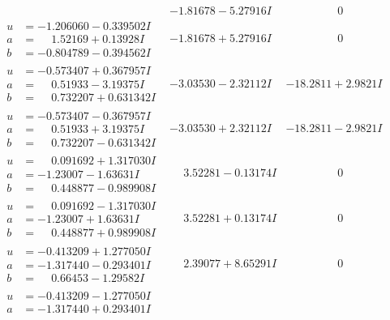 \documentclass[1p]{elsarticle_modified}
\theoremstyle{definition}
\begin{document}
$$\begin{array}{c|c|c}
 & -1.81678 - 5.27916 I & \phantom{-0.000000 } 0 \\ \hline\begin{aligned}
u &= -1.206060 - 0.339502 I \\
a &= \phantom{-}1.52169 + 0.13928 I \\
b &= -0.804789 - 0.394562 I\end{aligned}
 & -1.81678 + 5.27916 I & \phantom{-0.000000 } 0 \\ \hline\begin{aligned}
u &= -0.573407 + 0.367957 I \\
a &= \phantom{-}0.51933 - 3.19375 I \\
b &= \phantom{-}0.732207 + 0.631342 I\end{aligned}
 & -3.03530 - 2.32112 I & -18.2811 + 2.9821 I \\ \hline\begin{aligned}
u &= -0.573407 - 0.367957 I \\
a &= \phantom{-}0.51933 + 3.19375 I \\
b &= \phantom{-}0.732207 - 0.631342 I\end{aligned}
 & -3.03530 + 2.32112 I & -18.2811 - 2.9821 I \\ \hline\begin{aligned}
u &= \phantom{-}0.091692 + 1.317030 I \\
a &= -1.23007 - 1.63631 I \\
b &= \phantom{-}0.448877 - 0.989908 I\end{aligned}
 & \phantom{-}3.52281 - 0.13174 I & \phantom{-0.000000 } 0 \\ \hline\begin{aligned}
u &= \phantom{-}0.091692 - 1.317030 I \\
a &= -1.23007 + 1.63631 I \\
b &= \phantom{-}0.448877 + 0.989908 I\end{aligned}
 & \phantom{-}3.52281 + 0.13174 I & \phantom{-0.000000 } 0 \\ \hline\begin{aligned}
u &= -0.413209 + 1.277050 I \\
a &= -1.317440 - 0.293401 I \\
b &= \phantom{-}0.66453 - 1.29582 I\end{aligned}
 & \phantom{-}2.39077 + 8.65291 I & \phantom{-0.000000 } 0 \\ \hline\begin{aligned}
u &= -0.413209 - 1.277050 I \\
a &= -1.317440 + 0.293401 I \\

\end{aligned}
\end{array}$$
\end{document}
